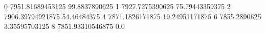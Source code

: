 0 7951.81689453125 99.8837890625
1 7927.7275390625 75.79443359375
2 7906.39794921875 54.46484375
4 7871.1826171875 19.24951171875
6 7855.2890625 3.35595703125
8 7851.93310546875 0.0
